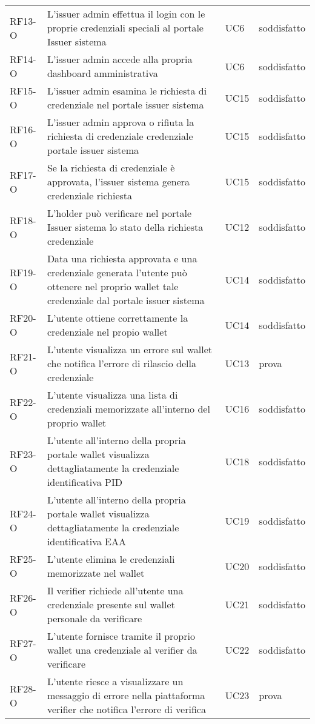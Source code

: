 \begin{longtable}{|p{}|p{}|p{}|p{}|}
        RF13-O & L'issuer admin effettua il login con le proprie credenziali speciali al portale Issuer sistema & UC6& soddisfatto\\ 
        RF14-O & L'issuer admin accede alla propria dashboard amministrativa & UC6& soddisfatto\\
        RF15-O & L'issuer admin esamina le richiesta di credenziale nel portale issuer sistema  & UC15& soddisfatto\\
        RF16-O & L'issuer admin approva o rifiuta la richiesta di credenziale credenziale portale issuer sistema & UC15& soddisfatto\\
        RF17-O & Se la richiesta di credenziale  è approvata, l'issuer sistema genera credenziale richiesta & UC15& soddisfatto\\
        RF18-O & L'holder può verificare nel portale Issuer sistema lo stato della richiesta credenziale & UC12& soddisfatto\\ 
        RF19-O & Data una richiesta approvata e una credenziale generata l'utente può ottenere nel proprio wallet tale credenziale dal portale issuer sistema & UC14 & soddisfatto\\
        RF20-O & L'utente ottiene correttamente la credenziale nel propio wallet & UC14& soddisfatto\\
        RF21-O & L'utente visualizza un errore sul wallet che notifica l'errore di rilascio della credenziale & UC13& prova\\
        RF22-O & L'utente visualizza una lista di credenziali memorizzate all'interno del proprio wallet& UC16& soddisfatto\\
        RF23-O & L'utente all'interno della propria portale wallet visualizza dettagliatamente la credenziale identificativa PID & UC18& soddisfatto\\
        RF24-O & L'utente all'interno della propria portale wallet visualizza dettagliatamente la credenziale identificativa EAA & UC19& soddisfatto\\
        RF25-O & L'utente elimina le credenziali memorizzate nel wallet & UC20& soddisfatto\\
        RF26-O & Il verifier richiede all'utente una credenziale presente sul wallet personale da verificare & UC21& soddisfatto\\
        RF27-O & L'utente fornisce tramite il proprio wallet una credenziale al verifier da verificare & UC22& soddisfatto\\
        RF28-O & L'utente riesce a visualizzare un messaggio di errore nella piattaforma verifier che notifica l'errore di verifica & UC23& prova\\
        \hline
    \end{longtable}

